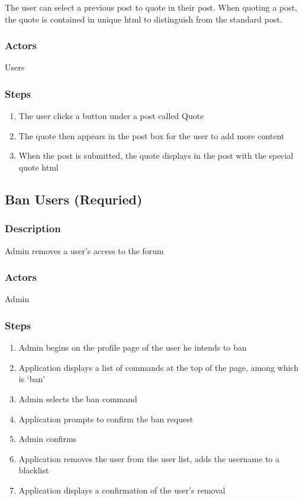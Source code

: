\documentclass[12pt]{scrartcl}
\begin{document}
The user can select a previous post to quote in their post. When quoting a post, the quote is contained in unique html to distinguish from the standard post. 
\subsubsection{Actors}

Users

\subsubsection{Steps}

\begin{enumerate}
\item The user clicks a button under a post called Quote
\item The quote then appears in the post box for the user to add more content
\item When the post is submitted, the quote displays in the post with the special quote html
\end{enumerate}


\subsection{Ban Users (Requried)}
\subsubsection{Description}
 
Admin removes a user’s access to the forum
 
\subsubsection{Actors}
 
Admin
 
\subsubsection{Steps}

\begin{enumerate}
\item Admin begins on the profile page of the user he intends to ban
\item Application displays a list of commands at the top of the page, among which is ‘ban’
\item Admin selects the ban command
\item Application prompts to confirm the ban request
\item Admin confirms
\item Application removes the user from the user list, adds the username to a blacklist
\item Application displays a confirmation of the user’s removal

\end {enumerate}
\end{document}
